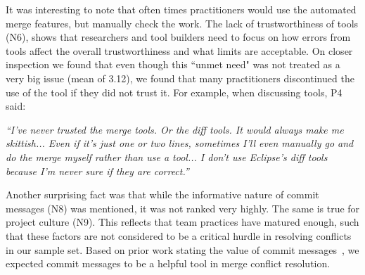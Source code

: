 It was interesting to note that often times practitioners would use the automated merge features, but manually check the work. The lack of trustworthiness of tools (N6), shows that researchers and tool builders need to focus on how errors from tools affect the overall trustworthiness and what limits are acceptable. On closer inspection we found that even though this ``unmet need" was not treated as a very big issue (mean of 3.12), we found that many practitioners discontinued the use of the tool if they did not trust it. For example, when discussing tools, P4 said:
\begin{displayquote}
\textit{``I've never trusted the merge tools. Or the diff tools. It would always make me skittish... Even if it's just one or two lines, sometimes I'll even manually go and do the merge myself rather than use a tool... I don't use Eclipse's diff tools because I'm never sure if they are correct.''}
\end{displayquote}

Another surprising fact was that while the informative nature of commit messages (N8) was mentioned, it was not ranked very highly. The same is true for project culture (N9). This reflects that team practices have matured enough, such that these factors are not considered to be a critical hurdle in resolving conflicts in our sample set. 
Based on prior work stating the value of commit messages~\cite{yamauchi2014clustering, hindle2009automatic, cortes2014automatically, hattori2008nature}, we expected commit messages to be a helpful tool in merge conflict resolution.





